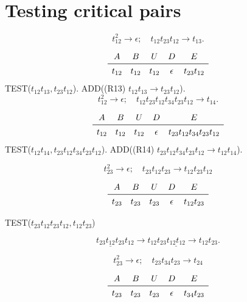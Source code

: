 \documentclass{article}
\begin{document}
\section{Testing critical pairs}
\[
t_{12}^2  \rightarrow \epsilon ; \quad
t_{12} t_{23} t_{12} \rightarrow t_{13}.
\]

\[
\begin{array}{ccccc}
A & B & U & D & E \\
\midrule
t_{12}  & t_{12} & t_{12} & \epsilon  & t_{23} t_{12}\\
\end{array}
\]
TEST($t_{12}t_{13}, t_{23} t_{12}$).
ADD((R13) $t_{12}t_{13} \rightarrow t_{23} t_{12}$).
\[
t_{12}^2  \rightarrow \epsilon ; \quad
t_{12} t_{23} t_{12} t_{34} t_{23} t_{12} \rightarrow t_{14}.
\]

\[
\begin{array}{ccccc}
A & B & U & D & E \\
\midrule
t_{12} & t_{12} & t_{12} & \epsilon & t_{23} t_{12} t_{34} t_{23} t_{12}\\
\end{array}
\]
TEST($t_{12}t_{14}, t_{23} t_{12} t_{34} t_{23} t_{12}$).
ADD((R14) $t_{23} t_{12} t_{34} t_{23} t_{12} \rightarrow t_{12}t_{14}$).


\[
t_{23}^2 \rightarrow \epsilon; \quad
t_{23} t_{12} t_{23} \rightarrow t_{12} t_{23} t_{12}
\]

\[
\begin{array}{ccccc}
A & B & U & D & E \\
\midrule
t_{23} & t_{23} & t_{23} & \epsilon  & t_{12} t_{23}\\
\end{array}
\]

TEST($t_{23}t_{12} t_{23} t_{12}, t_{12} t_{23}$)

\[\underline{t_{23}t_{12} t_{23}} t_{12} \rightarrow t_{12} t_{23} \underline{t_{12} t_{12}} \rightarrow t_{12} t_{23}.\]

\[
t_{23}^2 \rightarrow \epsilon; \quad
t_{23} t_{34} t_{23} \rightarrow t_{24}
\]

\[
\begin{array}{ccccc}
A & B & U & D & E \\
\midrule
t_{23} & t_{23} & t_{23} & \epsilon  & t_{34} t_{23}
\end{array}
\]
\end{document}
